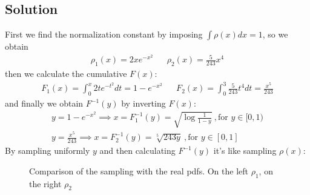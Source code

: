 \documentclass[../main.tex]{subfiles}
\begin{document}
\subsection{Solution}
First we find the normalization constant by imposing $\int \rho(x)dx = 1$, so we obtain 
\begin{align}
\rho_1(x) = 2 x e^{-x^2} && \rho_2(x) = \frac{5}{243}x^4
\end{align}
then we calculate the cumulative $F(x)$:
\begin{align}
F_1(x) = \int_0^x 2te^{-t^2}dt = 1-e^{-x^2} && F_2(x) = \int_0^3\frac{5}{243}t^4dt = \frac{x^5}{243}
\end{align}
and finally we obtain $F^{-1}(y)$ by inverting $F(x)$:
\begin{align}
y = 1-e^{-x^2} \implies x = F^{-1}_1(y) = \sqrt{\log{\frac{1}{1-y}}}\ , \text{for } y \in [0, 1) \\
y = \frac{x^5}{243} \implies x = F^{-1}_2(y) = \sqrt[5]{243y}\ , \text{for } y \in [0, 1]
\end{align}
By sampling uniformly $y$ and then calculating $F^{-1}(y)$ it's like sampling $\rho(x)$:

\begin{figure}[ht!]
    \centerline{}
    \caption{Comparison of the sampling with the real pdfs. On the left $\rho_1$, on the right $\rho_2$} 
    \label{fig: ex_1_2}
\end{figure}
\end{document}
